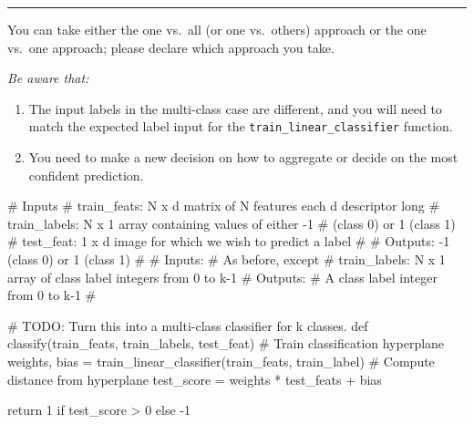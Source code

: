 \vspace{2ex}
\hrule
\vspace{1ex}

You can take either the one vs.~all (or one vs.~others) approach or the one vs.~one approach; please declare which approach you take.


\emph{Be aware that:}
\begin{enumerate}
    \item The input labels in the multi-class case are different, and you will need to match the expected label input for the \texttt{train\_linear\_classifier} function.
    \item You need to make a new decision on how to aggregate or decide on the most confident prediction.
\end{enumerate}


\pagebreak
\begin{tcolorbox}[enhanced jigsaw,breakable,pad at break*=1mm,colback=white!5!white,colframe=green!75!black,height fixed for=all]
\begin{python}
# Inputs
#   train_feats: N x d matrix of N features each d descriptor long
#   train_labels: N x 1 array containing values of either -1 
#               (class 0) or 1 (class 1)
#   test_feat: 1 x d image for which we wish to predict a label
#
#   Outputs: -1 (class 0) or 1 (class 1)
#
# Inputs:
#    As before, except
#    train_labels: N x 1 array of class label integers from 0 to k-1
# Outputs:
#    A class label integer from 0 to k-1
#

# TODO: Turn this into a multi-class classifier for k classes.
def classify(train_feats, train_labels, test_feat)
    # Train classification hyperplane
    weights, bias = train_linear_classifier(train_feats, train_label)
    # Compute distance from hyperplane
    test_score = weights * test_feats + bias

    return 1 if test_score > 0 else -1
    
\end{python}


\end{tcolorbox}

